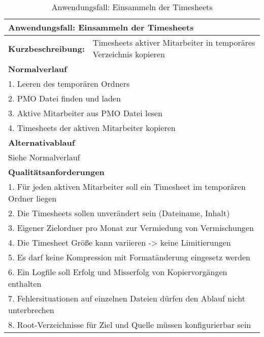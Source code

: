 \begin{table}[H]
    \begin{tabular}[H]{|l|l|}
        \hline
        \multicolumn{2}{|l|}{\textbf{Anwendungsfall:} Einsammeln der Timesheets} \\
        \hline
        \textbf{Kurzbeschreibung:} & Timesheets aktiver Mitarbeiter in temporäres Verzeichnis kopieren \\
        \hline
        \multicolumn{2}{|l|}{\textbf{Normalverlauf}} \\
        \hline
        \multicolumn{2}{|l|}{1. Leeren des temporären Ordners} \\
        \multicolumn{2}{|l|}{2. PMO Datei finden und laden} \\
        \multicolumn{2}{|l|}{3. Aktive Mitarbeiter aus PMO Datei lesen} \\
        \multicolumn{2}{|l|}{4. Timesheets der aktiven Mitarbeiter kopieren} \\
        \hline
        \multicolumn{2}{|l|}{\textbf{Alternativablauf}} \\
        \hline
        \multicolumn{2}{|l|}{Siehe Normalverlauf} \\
        \multicolumn{2}{|l|}{\textbf{Qualitätsanforderungen}} \\
        \hline
        \multicolumn{2}{|l|}{1. Für jeden aktiven Mitarbeiter soll ein Timesheet im temporären Ordner liegen} \\
        \multicolumn{2}{|l|}{2. Die Timesheets sollen unverändert sein (Dateiname, Inhalt)} \\
        \multicolumn{2}{|l|}{3. Eigener Zielordner pro Monat zur Vermiedung von Vermischungen} \\
        \multicolumn{2}{|l|}{4. Die Timesheet Größe kann variieren -> keine Limitierungen} \\
        \multicolumn{2}{|l|}{5. Es darf keine Kompression mit Formatänderung eingesetz werden} \\
        \multicolumn{2}{|l|}{6. Ein Logfile soll Erfolg und Misserfolg von Kopiervorgängen enthalten} \\
        \multicolumn{2}{|l|}{7. Fehlersituationen auf einzelnen Dateien dürfen den Ablauf nicht unterbrechen} \\
        \multicolumn{2}{|l|}{8. Root-Verzeichnisse für Ziel und Quelle müssen konfigurierbar sein} \\
        \hline
    \end{tabular}
    \caption{Anwendungsfall: Einsammeln der Timesheets}
    \label{tab:use-case-analyse-timesheets}
\end{table}

